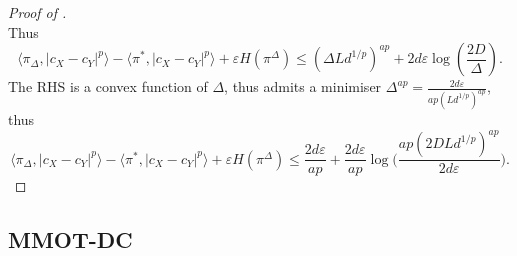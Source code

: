 \begin{proof}[Proof of ]
\begin{equation}
  \end{equation}
  Thus
  \begin{equation}
    \langle \pi_{\Delta}, \vert c_X - c_Y \vert^p \rangle -
    \langle \pi^*, \vert c_X - c_Y \vert^p \rangle + \varepsilon H(\pi^{\Delta})
    \leq (\Delta Ld^{1/p})^{ap} + 2 d \varepsilon \log(\frac{2D}{\Delta}).
  \end{equation}
  The RHS is a convex function of $\Delta$, thus admits a minimiser
  $\Delta^{ap} = \frac{2d \varepsilon}{ap (Ld^{1/p})^{ap}}$, thus
  \begin{equation}
    \langle \pi_{\Delta}, \vert c_X - c_Y \vert^p \rangle
    - \langle \pi^*, \vert c_X - c_Y \vert^p \rangle + \varepsilon H(\pi^{\Delta})
    \leq \frac{2 d \varepsilon}{ap}
    + \frac{2d \varepsilon}{ap} \log\Big( \frac{ap (2DLd^{1/p})^{ap}}{2d \varepsilon} \Big).
  \end{equation}
\end{proof}

\subsection{MMOT-DC} \label{appendix:subsec_mmot_dc}

